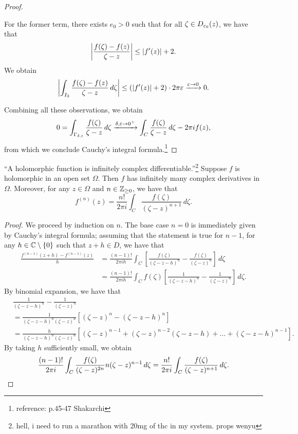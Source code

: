 \begin{proof}
\begin{enumerate}[(i)]
        For the former term, there exists $e_0 > 0$ such that for all $\zeta \in D_{\varepsilon_0}(z)$, we have that
        \[ \left\lvert \frac{f(\zeta) - f(z)}{\zeta - z} \right\rvert \leq \left\lvert f'(z) \right\rvert + 2. \]
        We obtain
        \[ \left\lvert \int_{I_3} \frac{f(\zeta) - f(z)}{\zeta - z} \, d\zeta \right\rvert \leq (\left\lvert f'(z) \right\rvert + 2) \cdot 2\pi \varepsilon \xrightarrow{\varepsilon \to 0} 0. \]
    \end{enumerate}
    Combining all these observations, we obtain
    \[ 0 = \int_{\Gamma_{\delta,\varepsilon}} \frac{f(\zeta)}{\zeta - z} \, d\zeta \xrightarrow{\delta,\varepsilon \to 0^+} \int_C \frac{f(\zeta)}{\zeta - z} \, d\zeta - 2\pi i f(z), \]
    from which we conclude Cauchy's integral formula.\footnote{reference: p.45-47 Shakarchi}
\end{proof}

\newpage
\begin{theorem}
    ``A holomorphic function is infinitely complex differentiable.''\footnote{hell, i need to run a marathon with 20mg of thc in my system. props wenyu} Suppose $f$ is holomorphic in an open set $\Omega$. Then $f$ has infinitely many complex derivatives in $\Omega$. Moreover, for any $z \in \Omega$ and $n \in \mathbb Z_{\geq 0}$, we have that
    \[ f^{(n)}(z) = \frac{n!}{2 \pi i} \int_C \frac{f(\zeta)}{(\zeta - z)^{n+1}} \, d\zeta. \]
\end{theorem}
\begin{proof}
    We proceed by induction on $n$. The base case $n = 0$ is immediately given by Cauchy's integral formula; assuming that the statement is true for $n - 1$, for any $h \in \mathbb C \setminus \{0\}$ such that $z + h \in D$, we have that
    \begin{align*}
        \frac{f^{(n-1)}(z+h) - f^{(n-1)}(z)}{h} &= \frac{(n-1)!}{2 \pi i h} \int_C \left[\frac{f(\zeta)}{(\zeta - z - h)^n} - \frac{f(\zeta)}{(\zeta - z)^n}\right] \, d\zeta \\
        &= \frac{(n-1)!}{2 \pi i h} \int_C f(\zeta) \left[\frac{1}{(\zeta - z - h)^n} - \frac{1}{(\zeta - z)^n}\right] \, d\zeta.
    \end{align*}
    By binomial expansion, we have that
    \begin{align*}
        &\frac{1}{(\zeta - z - h)^n} - \frac{1}{(\zeta - z)^n} \\
        &= \frac{1}{(\zeta - z - h)^n (\zeta - z)^n} \left[(\zeta - z)^n - (\zeta - z - h)^n\right] \\
        &= \frac{h}{(\zeta - z - h)^n (\zeta - z)^n} \left[(\zeta - z)^{n-1} + (\zeta - z)^{n-2}(\zeta - z - h) + \dots + (\zeta - z - h)^{n-1}\right].
    \end{align*}
    By taking $h$ sufficiently small, we obtain
    \[ \frac{(n - 1)!}{2 \pi i} \int_C \frac{f(\zeta)}{(\zeta - z)^{2n}} n(\zeta - z)^{n-1} \, d\zeta = \frac{n!}{2 \pi i} \int_C \frac{f(\zeta)}{(\zeta - z)^{n+1}} \, d\zeta. \qedhere \]
\end{proof}
